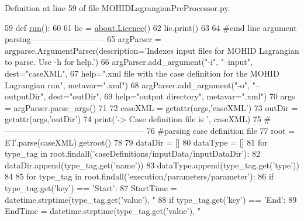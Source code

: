 Definition at line 59 of file M\+O\+H\+I\+D\+Lagrangian\+Pre\+Processor.\+py.


\begin{DoxyCode}
59 \textcolor{keyword}{def }\mbox{\hyperlink{namespace_m_o_h_i_d_lagrangian_pre_processor_a0e4b5abe6bc6cf76f0ed898743e538f3}{run}}():
60     
61     lic = \mbox{\hyperlink{classabout_1_1_licence}{about.Licence}}()
62     lic.print()
63     
64     \textcolor{comment}{#cmd line argument parsing---------------------------}
65     argParser = argparse.ArgumentParser(description=\textcolor{stringliteral}{'Indexes input files for MOHID Lagrangian to parse. Use
       -h for help.'})
66     argParser.add\_argument(\textcolor{stringliteral}{"-i"}, \textcolor{stringliteral}{"--input"}, dest=\textcolor{stringliteral}{"caseXML"},
67                     help=\textcolor{stringliteral}{".xml file with the case definition for the MOHID Lagrangian run"}, metavar=\textcolor{stringliteral}{".xml"})
68     argParser.add\_argument(\textcolor{stringliteral}{"-o"}, \textcolor{stringliteral}{"--outputDir"}, dest=\textcolor{stringliteral}{"outDir"},
69                     help=\textcolor{stringliteral}{"output directory"}, metavar=\textcolor{stringliteral}{".xml"})
70     args = argParser.parse\_args()
71     
72     caseXML = getattr(args,\textcolor{stringliteral}{'caseXML'})
73     outDir = getattr(args,\textcolor{stringliteral}{'outDir'})
74     print(\textcolor{stringliteral}{'-> Case definition file is '}, caseXML)
75     \textcolor{comment}{#---------------------------------------------------}
76     \textcolor{comment}{#parsing case definition file}
77     root = ET.parse(caseXML).getroot()
78     
79     dataDir = []
80     dataType = []
81     \textcolor{keywordflow}{for} type\_tag \textcolor{keywordflow}{in} root.findall(\textcolor{stringliteral}{'caseDefinitions/inputData/inputDataDir'}):
82         dataDir.append(type\_tag.get(\textcolor{stringliteral}{'name'}))
83         dataType.append(type\_tag.get(\textcolor{stringliteral}{'type'}))
84     
85     \textcolor{keywordflow}{for} type\_tag \textcolor{keywordflow}{in} root.findall(\textcolor{stringliteral}{'execution/parameters/parameter'}):
86         \textcolor{keywordflow}{if} type\_tag.get(\textcolor{stringliteral}{'key'}) == \textcolor{stringliteral}{'Start'}:
87             StartTime = datetime.strptime(type\_tag.get(\textcolor{stringliteral}{'value'}), \textcolor{stringliteral}{"%
88         \textcolor{keywordflow}{if} type\_tag.get(\textcolor{stringliteral}{'key'}) == \textcolor{stringliteral}{'End'}:
89             EndTime = datetime.strptime(type\_tag.get(\textcolor{stringliteral}{'value'}), \textcolor{stringliteral}{"%
}}
\end{DoxyCode}

